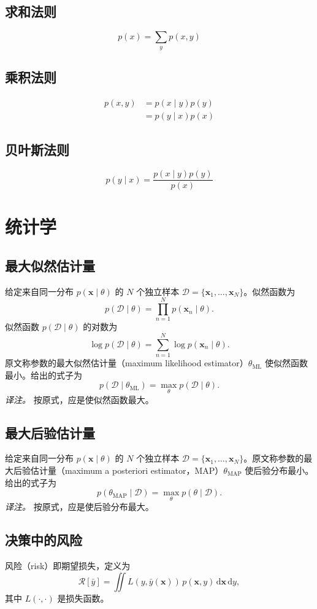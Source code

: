 \subsection{求和法则}
\[
p(x)=\sum_y p(x,y)
\]

\subsection{乘积法则}
\[
\begin{aligned}
p(x,y)&=p(x\mid y)p(y)\\
      &=p(y\mid x)p(x)
\end{aligned}
\]

\subsection{贝叶斯法则}
\[
p(y\mid x)=\frac{p(x\mid y)p(y)}{p(x)}
\]

\section{统计学}
\subsection{最大似然估计量}
给定来自同一分布 $p(\mathbf{x}\mid\theta)$ 的 $N$ 个独立样本 $\mathcal{D}=\{\mathbf{x}_1,\ldots,\mathbf{x}_N\}$。似然函数为
\[
p(\mathcal{D}\mid\theta)=\prod_{n=1}^{N}p(\mathbf{x}_n\mid\theta).
\]
似然函数 $p(\mathcal{D}\mid\theta)$ 的对数为
\[
\log p(\mathcal{D}\mid\theta)=\sum_{n=1}^{N}\log p(\mathbf{x}_n\mid\theta).
\]
原文称参数的最大似然估计量（maximum likelihood estimator）$\theta_{\mathrm{ML}}$ 使似然函数最小。给出的式子为
\[
p(\mathcal{D}\mid\theta_{\mathrm{ML}})=\max_\theta p(\mathcal{D}\mid\theta).
\]
\emph{译注。} 按原式，应是使似然函数最大。

\subsection{最大后验估计量}
给定来自同一分布 $p(\mathbf{x}\mid\theta)$ 的 $N$ 个独立样本 $\mathcal{D}=\{\mathbf{x}_1,\ldots,\mathbf{x}_N\}$。原文称参数的最大后验估计量（maximum a posteriori estimator，MAP）$\theta_{\mathrm{MAP}}$ 使后验分布最小。给出的式子为
\[
p(\theta_{\mathrm{MAP}}\mid\mathcal{D})=\max_\theta p(\theta\mid\mathcal{D}).
\]
\emph{译注。} 按原式，应是使后验分布最大。

\subsection{决策中的风险}
风险（risk）即期望损失，定义为
\[
\mathcal{R}[\bar{y}]=\iint L(y,\bar{y}(\mathbf{x}))\,p(\mathbf{x},y)\,
                         \mathrm{d}\mathbf{x}\,\mathrm{d}y,
\]
其中 $L(\cdot,\cdot)$ 是损失函数。

